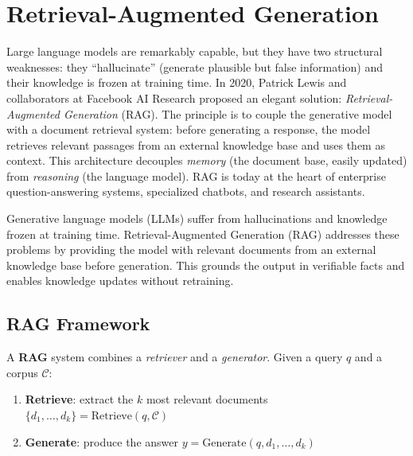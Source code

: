 \chapter{Retrieval-Augmented Generation}
\label{ch:rag}

Large language models are remarkably capable, but they have two structural weaknesses: they ``hallucinate'' (generate plausible but false information) and their knowledge is frozen at training time. In 2020, Patrick Lewis and collaborators at Facebook AI Research proposed an elegant solution: \emph{Retrieval-Augmented Generation} (RAG). The principle is to couple the generative model with a document retrieval system: before generating a response, the model retrieves relevant passages from an external knowledge base and uses them as context. This architecture decouples \emph{memory} (the document base, easily updated) from \emph{reasoning} (the language model). RAG is today at the heart of enterprise question-answering systems, specialized chatbots, and research assistants.

\begin{intuition}[title=\textbf{Why augment with retrieval?}]
Generative language models (LLMs) suffer from hallucinations and
knowledge frozen at training time. Retrieval-Augmented Generation (RAG)
addresses these problems by providing the model with relevant documents
from an external knowledge base before generation. This grounds the
output in verifiable facts and enables knowledge updates without
retraining.
\end{intuition}

\section{RAG Framework}
\label{sec:rag:framework}

\begin{definition}
A \textbf{RAG} system combines a \emph{retriever} and a \emph{generator}.
Given a query $q$ and a corpus $\mathcal{C}$:
\begin{enumerate}
    \item \textbf{Retrieve}: extract the $k$ most relevant documents
    $\{d_1, \ldots, d_k\} = \text{Retrieve}(q, \mathcal{C})$
    \item \textbf{Generate}: produce the answer
    $y = \text{Generate}(q, d_1, \ldots, d_k)$
\end{enumerate}
\end{definition}

